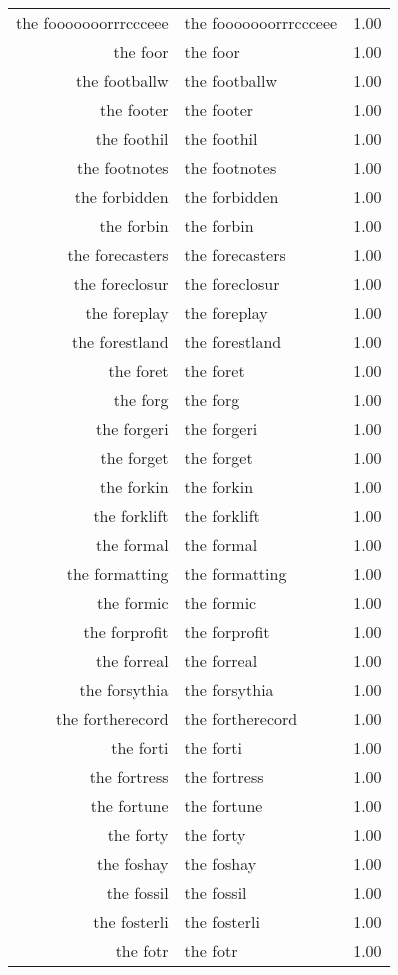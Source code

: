 \begin{table}[ht]
\begin{tabular}{rlr}
  the fooooooorrrccceee & the fooooooorrrccceee & 1.00 \\ 
  the foor & the foor & 1.00 \\ 
  the footballw & the footballw & 1.00 \\ 
  the footer & the footer & 1.00 \\ 
  the foothil & the foothil & 1.00 \\ 
  the footnotes & the footnotes & 1.00 \\ 
  the forbidden & the forbidden & 1.00 \\ 
  the forbin & the forbin & 1.00 \\ 
  the forecasters & the forecasters & 1.00 \\ 
  the foreclosur & the foreclosur & 1.00 \\ 
  the foreplay & the foreplay & 1.00 \\ 
  the forestland & the forestland & 1.00 \\ 
  the foret & the foret & 1.00 \\ 
  the forg & the forg & 1.00 \\ 
  the forgeri & the forgeri & 1.00 \\ 
  the forget & the forget & 1.00 \\ 
  the forkin & the forkin & 1.00 \\ 
  the forklift & the forklift & 1.00 \\ 
  the formal & the formal & 1.00 \\ 
  the formatting & the formatting & 1.00 \\ 
  the formic & the formic & 1.00 \\ 
  the forprofit & the forprofit & 1.00 \\ 
  the forreal & the forreal & 1.00 \\ 
  the forsythia & the forsythia & 1.00 \\ 
  the fortherecord & the fortherecord & 1.00 \\ 
  the forti & the forti & 1.00 \\ 
  the fortress & the fortress & 1.00 \\ 
  the fortune & the fortune & 1.00 \\ 
  the forty & the forty & 1.00 \\ 
  the foshay & the foshay & 1.00 \\ 
  the fossil & the fossil & 1.00 \\ 
  the fosterli & the fosterli & 1.00 \\ 
  the fotr & the fotr & 1.00 \\ 

\end{tabular}
\end{table}
